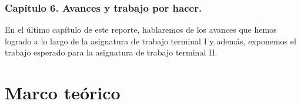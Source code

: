\documentclass[12pt, a4paper, titlepage]{report}
\begin{document}
            \subsection{Capítulo 6. Avances y trabajo por hacer.}
                En el último capítulo de este reporte, hablaremos de los avances que hemos logrado a lo largo de la asignatura de trabajo terminal I y además, exponemos el trabajo esperado para la asignatura de trabajo terminal II.
                
    
	\chapter{\textcolor{azulescom}{Marco teórico}}
\end{document}

